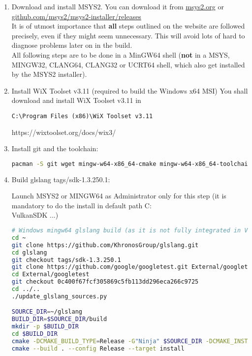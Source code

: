 \begin{enumerate}

\item Download and install MSYS2. You can download it from \href{https://www.msys2.org/}{msys2.org} or \href{https://github.com/msys2/msys2-installer/releases}{github.com/msys2/msys2-installer/releases}\\
It is of utmost importance that \textbf{all} steps outlined on the website are followed precisely, even if they might
seem unnecessary.
This will avoid lots of hard to diagnose problems later on in the build.\\

All following steps are to be done in a MinGW64 shell (\textbf{not} in a MSYS, MINGW32, CLANG64, CLANG32 or UCRT64 shell,
which also get installed by the MSYS2 installer).

\item Install WiX Toolset v3.11 (required to build the Windows x64 MSI)
You shall download and install WiX Toolset v3.11 in \begin{verbatim}C:\Program Files (x86)\WiX Toolset v3.11\end{verbatim}
https://wixtoolset.org/docs/wix3/

\item Install git and the toolchain:

\begin{lstlisting}[language=sh, numbers=none]
pacman -S git wget mingw-w64-x86_64-cmake mingw-w64-x86_64-toolchain
\end{lstlisting}

\item Build glslang tags/sdk-1.3.250.1:

Launch MSYS2 or MINGW64 as Administrator only for this step (it is mandatory to do the install in default path C:\\VulkanSDK ...)
\begin{lstlisting}[language=sh, numbers=none]
# Windows mingw64 glslang build (as it is not fully integrated in VulkanSDK-1.3.250.1 for Windows and built with Visual Studio 2019)
cd ~
git clone https://github.com/KhronosGroup/glslang.git
cd glslang
git checkout tags/sdk-1.3.250.1
git clone https://github.com/google/googletest.git External/googletest
cd External/googletest
git checkout 0c400f67fcf305869c5fb113dd296eca266c9725
cd ../..
./update_glslang_sources.py

SOURCE_DIR=~/glslang
BUILD_DIR=$SOURCE_DIR/build
mkdir -p $BUILD_DIR
cd $BUILD_DIR
cmake -DCMAKE_BUILD_TYPE=Release -G"Ninja" $SOURCE_DIR -DCMAKE_INSTALL_PREFIX="$(pwd)/install"
cmake --build . --config Release --target install
\end{lstlisting}


\end{enumerate}
